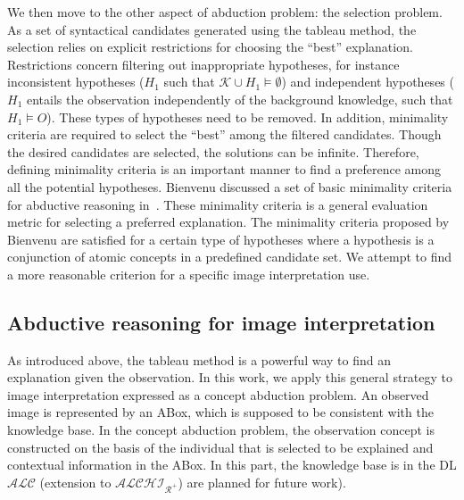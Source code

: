 \documentclass{article}
\begin{document}
We then move to the other aspect of abduction problem: the selection problem.
As a set of syntactical candidates generated using the tableau method, the selection relies on explicit restrictions for choosing the ``best'' explanation.
Restrictions concern filtering out inappropriate hypotheses,
for instance inconsistent hypotheses ($H_1$ such that $\mathcal{K}\cup H_1\vDash \emptyset$) and independent hypotheses ($H_1$ entails the observation independently of the background knowledge,
such that $H_1\vDash O$).
These types of hypotheses need to be removed.
In addition, minimality criteria are required to select the ``best'' among the filtered candidates.
Though the desired candidates are selected, the solutions can be infinite.
Therefore, defining minimality criteria is an important manner to find a preference among all the potential hypotheses.
Bienvenu  discussed a set of basic minimality criteria for abductive reasoning in~\cite{bienvenu08complexity}.
These minimality criteria is a general evaluation metric for selecting a preferred explanation. 
The minimality criteria proposed by Bienvenu are satisfied for a certain type of hypotheses where a hypothesis is a conjunction of atomic concepts in a predefined candidate set.
We attempt to find a more reasonable criterion for a specific image interpretation use.

\subsection{Abductive reasoning for image interpretation}
As introduced above, the tableau method is a powerful way to find an explanation given the observation.
In this work, we apply this general strategy to image interpretation expressed as a concept abduction problem.
An observed image is represented by an ABox, which is supposed to be consistent with the knowledge base. 
In the concept abduction problem, the observation concept is constructed on the basis of the individual that is selected to be explained and
contextual information in the ABox.
In this part, the knowledge base is in the DL $\mathcal{ALC}$ (extension to $\mathcal{ALCHI_{R^+}}$) are planned for future work).
\end{document}

